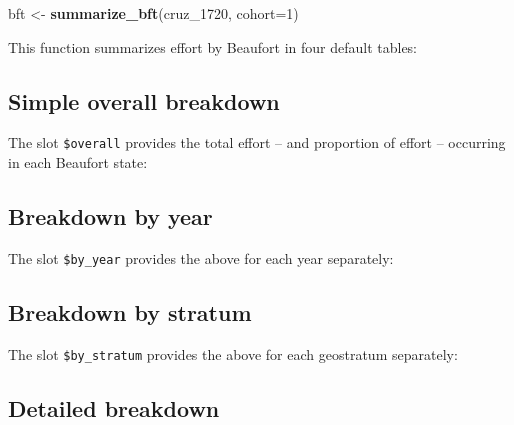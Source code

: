 \documentclass[
]{book}
\newenvironment{Shaded}{\begin{snugshade}}{\end{snugshade}}
\newcommand{\DataTypeTok}[1]{\textcolor[rgb]{0.13,0.29,0.53}{#1}}
\newcommand{\DecValTok}[1]{\textcolor[rgb]{0.00,0.00,0.81}{#1}}
\newcommand{\KeywordTok}[1]{\textcolor[rgb]{0.13,0.29,0.53}{\textbf{#1}}}
\newcommand{\NormalTok}[1]{#1}
\newcommand{\OperatorTok}[1]{\textcolor[rgb]{0.81,0.36,0.00}{\textbf{#1}}}
\newcommand{\StringTok}[1]{\textcolor[rgb]{0.31,0.60,0.02}{#1}}
\begin{document}
\begin{Shaded}
\begin{Highlighting}[]
\NormalTok{bft <-}\StringTok{ }\KeywordTok{summarize_bft}\NormalTok{(cruz_}\DecValTok{1720}\NormalTok{, }\DataTypeTok{cohort=}\DecValTok{1}\NormalTok{)}
\end{Highlighting}
\end{Shaded}

This function summarizes effort by Beaufort in four default tables:

\begin{Shaded}
\end{Shaded}

\hypertarget{simple-overall-breakdown}{%
\subsection*{Simple overall breakdown}\label{simple-overall-breakdown}}

The slot \texttt{\$overall} provides the total effort -- and proportion of effort -- occurring in each Beaufort state:

\hypertarget{breakdown-by-year}{%
\subsection*{Breakdown by year}\label{breakdown-by-year}}

The slot \texttt{\$by\_year} provides the above for each year separately:

\hypertarget{breakdown-by-stratum}{%
\subsection*{Breakdown by stratum}\label{breakdown-by-stratum}}

The slot \texttt{\$by\_stratum} provides the above for each geostratum separately:

\hypertarget{detailed-breakdown}{%
\subsection*{Detailed breakdown}\label{detailed-breakdown}}
\end{document}
